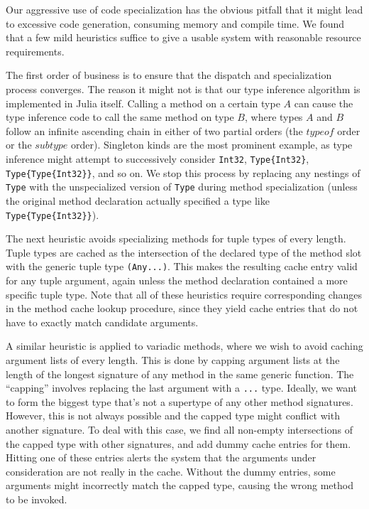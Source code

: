 \documentclass[9pt]{sigplanconf}
\begin{document}
Our aggressive use of code specialization has the obvious pitfall that it might
lead to excessive code generation, consuming memory and compile time. We found
that a few mild heuristics suffice to give a usable system with reasonable
resource requirements.

The first order of business is to ensure that the dispatch and specialization
process converges. The reason it might not is that our type inference algorithm
is implemented in Julia itself. Calling a method on a certain type $A$ can cause
the type inference code to call the same method on type $B$, where types
$A$ and $B$
follow an infinite ascending chain in either of two partial orders (the
$typeof$ order or the $subtype$ order). Singleton kinds are the most
prominent example, as type inference might attempt to successively consider
{\tt Int32}, {\tt Type\{Int32\}}, {\tt Type\{Type\{Int32\}\}}, and so on. We
stop this process by replacing any nestings of {\tt Type} with the
unspecialized version of {\tt Type} during method specialization (unless the
original method declaration actually specified a type like
{\tt Type\{Type\{Int32\}\}}).

The next heuristic avoids specializing methods for tuple types of every length.
Tuple types are cached as the intersection of the declared type of the method
slot with the generic tuple type {\tt (Any...)}. This makes the resulting cache
entry valid for any tuple argument, again unless the method declaration
contained a more specific tuple type. Note that all of these heuristics require
corresponding changes in the method cache lookup procedure, since they yield
cache entries that do not have to exactly match candidate arguments.

A similar heuristic is applied to variadic methods, where we wish to avoid
caching argument lists of every length. This is done by capping argument lists
at the length of the longest signature of any method in the same generic
function. The ``capping'' involves replacing the last argument with a
{\tt ...} type. Ideally, we want to form the biggest type that's not a
supertype of any other method signatures. However, this is not always possible
and the capped type might conflict with another signature. To deal with this
case, we find all non-empty intersections of the capped type with other
signatures, and add dummy cache entries for them. Hitting one of these entries
alerts the system that the arguments under consideration are not really in the
cache. Without the dummy entries, some arguments might incorrectly match the
capped type, causing the wrong method to be invoked.
\end{document}
